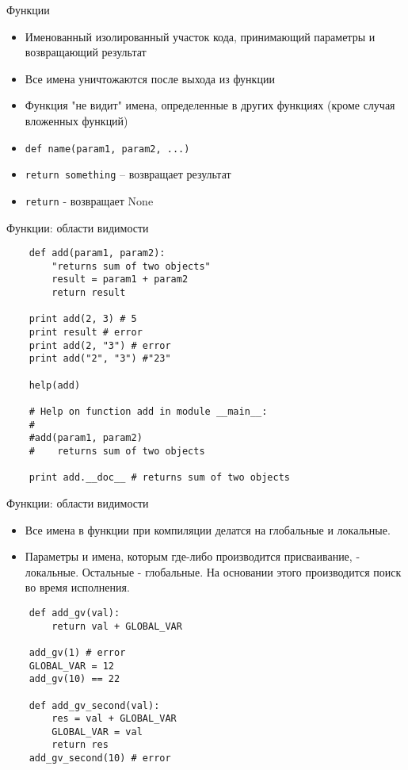 \documentclass{article}
\begin{document}
\LARGE

\begin{center}Функции\end{center}
\begin{itemize}
    \item Именованный изолированный участок кода,
        принимающий параметры и возвращающий результат
    \item Все имена уничтожаются после выхода из функции
    \item Функция "не видит" имена, определенные в других 
        функциях (кроме случая вложенных функций)
    \item \lstinline!def name(param1, param2, ...)!
    \item \lstinline!return something! – возвращает результат
    \item \lstinline!return! - возвращает None
\end{itemize}
\newpage

\begin{center} Функции: области видимости \end{center}
\begin{lstlisting}
    def add(param1, param2):
        "returns sum of two objects"
        result = param1 + param2
        return result

    print add(2, 3) # 5
    print result # error
    print add(2, "3") # error
    print add("2", "3") #"23"

    help(add)
    
    # Help on function add in module __main__:
    #
    #add(param1, param2)
    #    returns sum of two objects

    print add.__doc__ # returns sum of two objects
\end{lstlisting}
\newpage

\begin{center} Функции: области видимости \end{center}
\begin{itemize}
    \item Все имена в функции при компиляции делатся на глобальные и локальные.
    \item Параметры и имена, которым где-либо производится присваивание, - локальные.
          Остальные - глобальные. На основании этого производится поиск во время исполнения.
\end{itemize}
\begin{lstlisting}
    def add_gv(val):
        return val + GLOBAL_VAR

    add_gv(1) # error
    GLOBAL_VAR = 12
    add_gv(10) == 22

    def add_gv_second(val):
        res = val + GLOBAL_VAR
        GLOBAL_VAR = val
        return res
    add_gv_second(10) # error
\end{lstlisting}
\newpage
\end{document}
